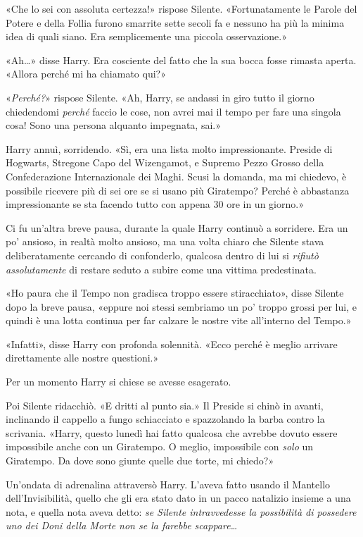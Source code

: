«Che lo sei con assoluta certezza!» rispose Silente. «Fortunatamente le Parole del Potere e della Follia furono smarrite sette secoli fa e nessuno ha più la minima idea di quali siano. Era semplicemente una piccola osservazione.»

«Ah…» disse Harry. Era cosciente del fatto che la sua bocca fosse rimasta aperta. «Allora perché mi ha chiamato qui?»

«\textit{Perché?}» rispose Silente. «Ah, Harry, se andassi in giro tutto il giorno chiedendomi \textit{perché} faccio le cose, non avrei mai il tempo per fare una singola cosa! Sono una persona alquanto impegnata, sai.»

Harry annuì, sorridendo. «Sì, era una lista molto impressionante. Preside di Hogwarts, Stregone Capo del Wizengamot, e Supremo Pezzo Grosso della Confederazione Internazionale dei Maghi. Scusi la domanda, ma mi chiedevo, è possibile ricevere più di sei ore se si usano più Giratempo? Perché è abbastanza impressionante se sta facendo tutto con appena 30 ore in un giorno.»

Ci fu un’altra breve pausa, durante la quale Harry continuò a sorridere. Era un po’ ansioso, in realtà molto ansioso, ma una volta chiaro che Silente stava deliberatamente cercando di confonderlo, qualcosa dentro di lui si \textit{rifiutò assolutamente} di restare seduto a subire come una vittima predestinata.

«Ho paura che il Tempo non gradisca troppo essere stiracchiato», disse Silente dopo la breve pausa, «eppure noi stessi sembriamo un po’ troppo grossi per lui, e quindi è una lotta continua per far calzare le nostre vite all’interno del Tempo.»

«Infatti», disse Harry con profonda solennità. «Ecco perché è meglio arrivare direttamente alle nostre questioni.»

Per un momento Harry si chiese se avesse esagerato.

Poi Silente ridacchiò. «E dritti al punto sia.» Il Preside si chinò in avanti, inclinando il cappello a fungo schiacciato e spazzolando la barba contro la scrivania. «Harry, questo lunedì hai fatto qualcosa che avrebbe dovuto essere impossibile anche con un Giratempo. O meglio, impossibile con \textit{solo} un Giratempo. Da dove sono giunte quelle due torte, mi chiedo?»

Un’ondata di adrenalina attraversò Harry. L’aveva fatto usando il Mantello dell’Invisibilità, quello che gli era stato dato in un pacco natalizio insieme a una nota, e quella nota aveva detto: \textit{se Silente intravvedesse la possibilità di possedere uno dei Doni della Morte non se la farebbe scappare…}

